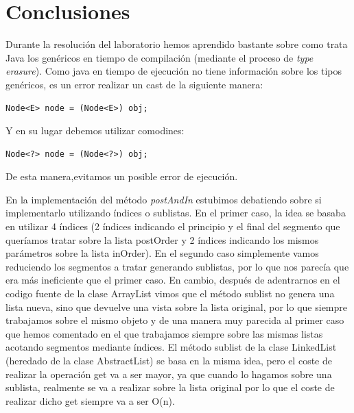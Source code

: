 \documentclass{article}
\begin{document}
\section{Conclusiones}

Durante la resolución del laboratorio hemos aprendido bastante sobre como trata Java los genéricos en tiempo de compilación (mediante el proceso de \textit{type erasure}).
Como java en tiempo de ejecución no tiene información sobre los tipos genéricos, es un error realizar un cast de la siguiente manera:
\begin{verbatim}
Node<E> node = (Node<E>) obj;
\end{verbatim}
\newline
Y en su lugar debemos utilizar comodines:
\begin{verbatim}
Node<?> node = (Node<?>) obj;
\end{verbatim}
De esta manera,evitamos un posible error de ejecución.

En la implementación del método \textit{postAndIn} estubimos debatiendo sobre si implementarlo utilizando índices o sublistas.\newline
En el primer caso, la idea se basaba en utilizar 4 índices (2 índices indicando el principio y el final del segmento que queríamos tratar sobre la lista postOrder y 2 índices indicando los mismos parámetros sobre la lista inOrder).\newline
En el segundo caso simplemente vamos reduciendo los segmentos a tratar generando sublistas, por lo que nos parecía que era más ineficiente que el primer caso.\newline
En cambio, después de adentrarnos en el codigo fuente de la clase ArrayList vimos que el método sublist no genera una lista nueva, sino que devuelve una vista sobre la lista original, por lo que siempre trabajamos sobre el mismo objeto y de una manera muy parecida al primer caso que hemos comentado en el que trabajamos siempre sobre las mismas listas acotando segmentos mediante índices.\newline
El método sublist de la clase LinkedList (heredado de la clase AbstractList) se
basa en la misma idea, pero el coste de realizar la operación get va a ser
mayor, ya que  cuando lo hagamos sobre una sublista, realmente se va a realizar
sobre la lista original por lo que el coste de realizar dicho get siempre va a
ser O(n).
\end{document}
